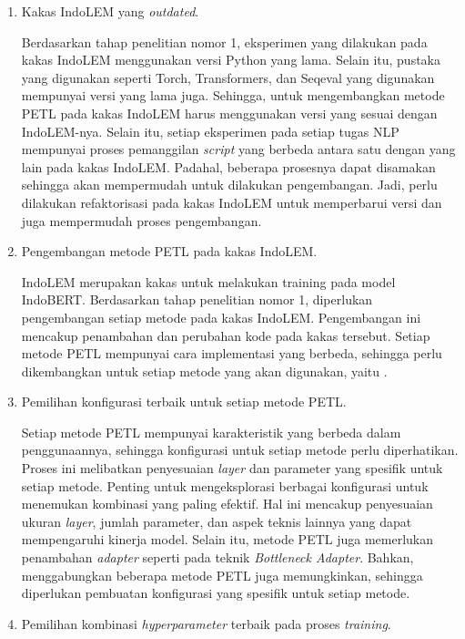 \begin{enumerate}
    \item Kakas IndoLEM yang \textit{outdated}.
    
    Berdasarkan tahap penelitian nomor 1, eksperimen yang dilakukan pada kakas IndoLEM menggunakan versi Python yang lama. Selain itu, pustaka yang digunakan seperti Torch, Transformers, dan Seqeval yang digunakan mempunyai versi yang lama juga. Sehingga, untuk mengembangkan metode PETL pada kakas IndoLEM harus menggunakan versi yang sesuai dengan IndoLEM-nya. Selain itu, setiap eksperimen pada setiap tugas NLP mempunyai proses pemanggilan \textit{script} yang berbeda antara satu dengan yang lain pada kakas IndoLEM. Padahal, beberapa prosesnya dapat disamakan sehingga akan mempermudah untuk dilakukan pengembangan. Jadi, perlu dilakukan refaktorisasi pada kakas IndoLEM untuk memperbarui versi dan juga mempermudah proses pengembangan. 

    \item Pengembangan metode PETL pada kakas IndoLEM.
    
    IndoLEM merupakan kakas untuk melakukan training pada model IndoBERT. Berdasarkan tahap penelitian nomor 1, diperlukan pengembangan setiap metode pada kakas IndoLEM. Pengembangan ini mencakup penambahan dan perubahan kode pada kakas tersebut. Setiap metode PETL mempunyai cara implementasi yang berbeda, sehingga perlu dikembangkan untuk setiap metode yang akan digunakan, yaitu \methodPETL.

    \item Pemilihan konfigurasi terbaik untuk setiap metode PETL.
    
    Setiap metode PETL mempunyai karakteristik yang berbeda dalam penggunaannya, sehingga konfigurasi untuk setiap metode perlu diperhatikan. Proses ini melibatkan penyesuaian \textit{layer} dan parameter yang spesifik untuk setiap metode. Penting untuk mengeksplorasi berbagai konfigurasi untuk menemukan kombinasi yang paling efektif. Hal ini mencakup penyesuaian ukuran \textit{layer}, jumlah parameter, dan aspek teknis lainnya yang dapat mempengaruhi kinerja model. Selain itu, metode PETL juga memerlukan penambahan \textit{adapter} seperti pada teknik \textit{Bottleneck Adapter}. Bahkan, menggabungkan beberapa metode PETL juga memungkinkan, sehingga diperlukan pembuatan konfigurasi yang spesifik untuk setiap metode.

    \item Pemilihan kombinasi \textit{hyperparameter} terbaik pada proses \textit{training}.
    

\end{enumerate}
